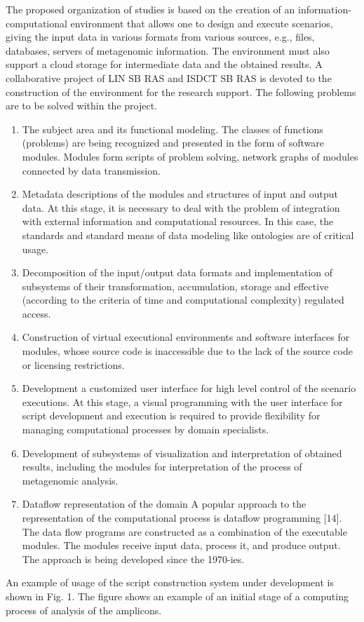 \documentclass[conference,a4paper]{IEEEtran}
\begin{document}
The proposed organization of studies is based on the creation of an information-computational environment that allows one to design and execute scenarios, giving the input data in various formats from various sources, e.g., files, databases, servers of metagenomic information. The environment must also support a cloud storage for intermediate data and the obtained results. A collaborative project of LIN SB RAS and ISDCT SB RAS is devoted to the construction of the environment for the research support. The following problems are to be solved within the project.
\begin{enumerate}
\item The subject area and its functional modeling. The classes of
  functions (problems) are being recognized and presented in the form
  of software modules. Modules form scripts of problem solving,
  network graphs of modules connected by data transmission.
\item Metadata descriptions of the modules and structures of input and
  output data. At this stage, it is necessary to deal with the problem
  of integration with external information and computational
  resources. In this case, the standards and standard means of data
  modeling like ontologies are of critical usage.
\item Decomposition of
  the input/output data formats and implementation of subsystems of
  their transformation, accumulation, storage and effective (according
  to the criteria of time and computational complexity) regulated
  access.
\item Construction of virtual executional environments and
  software interfaces for modules, whose source code is inaccessible
  due to the lack of the source code or licensing restrictions.
\item Development a customized user interface for high level control of
  the scenario executions. At this stage, a visual programming with
  the user interface for script development and execution is required
  to provide flexibility for managing computational processes by
  domain specialists.
\item Development of subsystems of visualization
  and interpretation of obtained results, including the modules for
  interpretation of the process of metagenomic analysis.
\item Dataflow
  representation of the domain A popular approach to the
  representation of the computational process is dataflow programming
  [14]. The data flow programs are constructed as a combination of the
  executable modules. The modules receive input data, process it, and
  produce output. The approach is being developed since the 1970-ies.
\end{enumerate}
An example of usage of the script construction system under development is shown in Fig. 1. The figure shows an example of an initial stage of a computing process of analysis of the amplicons.
\end{document}
